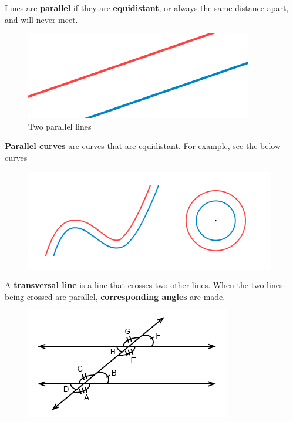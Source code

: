 \documentclass{article}
\begin{document}
            \noindent Lines are \textbf{parallel} if they are \textbf{equidistant}, or always the
            same distance apart, and will never meet. \\

            \begin{figure} [hbt!]
                \centering
                \includegraphics[scale = 0.4] {Resources/Unit1Basics/parallel.PNG}
                \caption*{Two parallel lines}
            \end{figure}

            \noindent \textbf{Parallel curves} are curves that are equidistant. For example, see the
            below curves \\

            \begin{figure} [hbt!]
                \centering
                \includegraphics[scale = 0.4] {Resources/Unit1Basics/parallel_curves.PNG}
            \end{figure}

            \noindent A \textbf{transversal line} is a line that crosses two other lines. When the
            two lines being crossed are parallel, \textbf{corresponding angles} are made.

            \begin{figure} [hbt!]
                \centering
                \includegraphics[scale = 0.6] {Resources/Unit1Basics/corresponding.PNG}
            \end{figure}
\end{document}
